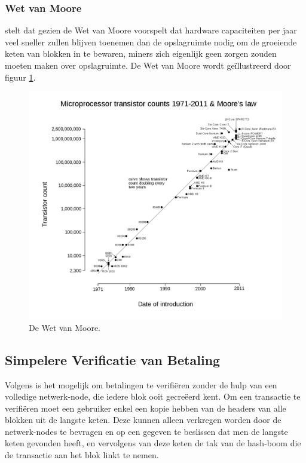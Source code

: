 		\subsubsection{Wet van Moore}	
		\textcite{Nakamoto2008} stelt dat gezien de Wet van Moore voorspelt dat hardware capaciteiten per jaar veel sneller zullen blijven toenemen dan de opslagruimte nodig om de groeiende keten van blokken in te bewaren, miners zich eigenlijk geen zorgen zouden moeten maken over opslagruimte. De Wet van Moore wordt geïllustreerd door figuur \ref{fig:moore}.
		\begin{figure}
			\includegraphics[width=\linewidth]{img/moore.png}
			\caption{De Wet van Moore.}
			\label{fig:moore}
		\end{figure}
		
		\subsection{Simpelere Verificatie van Betaling}
		Volgens \textcite{Nakamoto2008} is het mogelijk om betalingen te verifiëren zonder de hulp van een volledige netwerk-node, die iedere blok ooit gecreëerd kent. Om een transactie te verifiëren moet een gebruiker enkel een kopie hebben van de headers van alle blokken uit de langste keten. Deze kunnen alleen verkregen worden door de netwerk-nodes te bevragen en op een gegeven te beslissen dat men de langste keten gevonden heeft, en vervolgens van deze keten de tak van de hash-boom die de transactie aan het blok linkt te nemen.
	
